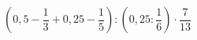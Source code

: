 \begin{ex}[type=calculate]
	\begin{condition}
		\( \left( 0,5-\dfrac{1}{3}+0,25-\dfrac{1}{5} \right):\left( 0,25:\dfrac{1}{6} \right)\cdot\dfrac{7}{13} \)
	\end{condition}
	\answer{}
\end{ex}